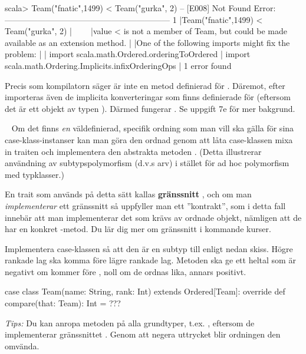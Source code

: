 \SubtaskSolved
\begin{REPLnonum}
scala> Team("fnatic",1499) < Team("gurka", 2)
-- [E008] Not Found Error: ------------------------------------------------------------
1 |Team("fnatic",1499) < Team("gurka", 2)
  |^^^^^^^^^^^^^^^^^^^^^
  |value < is not a member of Team, but could be made available as an extension method.
  |
  |One of the following imports might fix the problem:
  |
  |  import scala.math.Ordered.orderingToOrdered
  |  import scala.math.Ordering.Implicits.infixOrderingOps
  |
1 error found
\end{REPLnonum}
Precis som kompilatorn säger är \code{<} inte en metod definierad för .
Däremot, efter  importeras även de implicita konverteringar som finns definierade för  (eftersom det är ett objekt av typen ).
Därmed fungerar \code{<}. Se uppgift 7e för mer bakgrund.


\QUESTEND







\QUESTBEGIN

\Task  \what~  Om det finns \emph{en} väldefinierad, specifik ordning som man vill ska gälla för sina case-klass-instanser kan man göra den ordnad genom att låta case-klassen mixa in traiten  och implementera den abstrakta metoden . (Detta illustrerar användning av subtypspolymorfism (d.v.s arv) i stället för ad hoc polymorfism med typklasser.)

\begin{Background}
En trait som används på detta sätt kallas \textbf{gränssnitt} , och om man \emph{implementerar} ett gränssnitt så uppfyller man ett ''kontrakt'', som i detta fall innebär att man implementerar det som krävs av ordnade objekt, nämligen att de har en konkret -metod. Du lär dig mer om gränssnitt i kommande kurser.
\end{Background}

\Subtask Implementera case-klassen  så att den är en subtyp till  enligt nedan skiss. Högre rankade lag ska komma före lägre rankade lag. Metoden  ska ge ett heltal som är negativt om  kommer före , noll om de ordnas lika, annars positivt.

\begin{Code}
case class Team(name: String, rank: Int) extends Ordered[Team]:
  override def compare(that: Team): Int = ???
\end{Code}
\emph{Tips:} Du kan anropa metoden  på alla grundtyper, t.ex. , eftersom de implementerar gränssnittet . Genom att negera uttrycket blir ordningen den omvända. 

